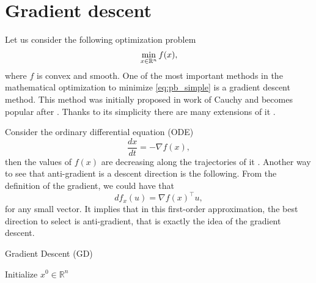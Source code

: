 \section{Gradient descent}\label{sec:basics_gd}
Let us consider the following optimization problem
\begin{equation}\label{eq:pb_simple}
    \min_{x\in\mathbb{R}^n}f(x),
\end{equation}
where $f$ is convex and smooth. One of the most important methods in the mathematical optimization to minimize \eqref{eq:pb_simple} is a gradient descent method. This method was initially proposed in work of Cauchy \cite[Extrait $383$]{cauchy1847methode} and becomes popular after \cite{polyak1963gradient}. Thanks to its simplicity there are many extensions of it \cite{polyak1969minimization, polyak1969conjugate, nesterov2005smooth, beck2009fast}.

Consider the ordinary differential equation (ODE)
$$
\frac{d x}{d t} = -\nabla f(x),
$$
then the values of $f(x)$ are decreasing along the trajectories of it \cite{cauchy1847methode}. Another way to see that anti-gradient is a descent direction is the following. From the definition of the gradient, we could have that
$$
df_x(u) = \nabla f(x)^\top u,
$$
for any small vector. It implies that in this first-order approximation, the best direction to select is anti-gradient, that is exactly the idea of the gradient descent.

\begin{algorithm}
    \caption{Gradient Descent (GD)}
    \label{algo:gd}
    \begin{algorithmic}
        \STATE Initialize $x^0\in\mathbb{R}^n$
        \ENDFOR
    \end{algorithmic}
\end{algorithm}

